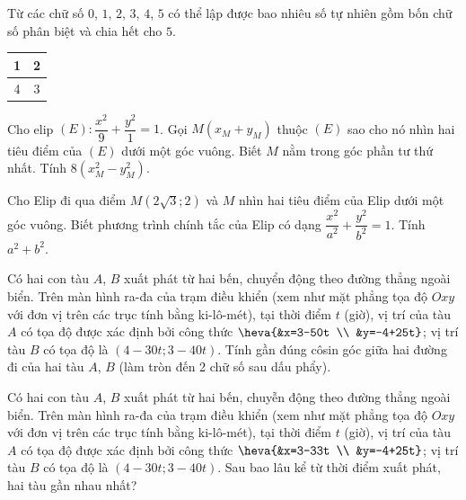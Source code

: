 \begin{ex}%
	Từ các chữ số $0$, $1$, $2$, $3$, $4$, $5$ có thể lập được bao nhiêu số tự nhiên gồm bốn chữ số phân biệt và chia hết cho $5$.
\loigiai{}
\end{ex}
\begin{ex}%
	{
	\begin{tabular}{|c|c|}
		\hline
		1& 2\\
		\hline
		4& 3\\
		\hline
	\end{tabular}	
	}
	\loigiai{}
\end{ex}
\begin{ex}%
Cho elip $(E)\colon \dfrac{x^2}{9}+\dfrac{y^2}{1}=1$. Gọi $M\left(x_M+y_M\right)$ thuộc $(E)$ sao cho nó nhìn hai tiêu điểm của $(E)$ dưới một góc vuông. Biết $M$ nằm trong góc phần tư thứ nhất. Tính $8\left(x_M^2-y_M^2\right)$.

\loigiai{}
\end{ex}

\begin{ex}%
Cho Elip đi qua điểm $M\left(2\sqrt{3}; 2\right)$ và $M$ nhìn hai tiêu điểm của Elip dưới một góc vuông. Biết phương trình chính tắc của Elip có dạng $\dfrac{x^2}{a^2}+\dfrac{y^2}{b^2}=1$. Tính $a^2+b^2$.
\loigiai{}
\end{ex}

\begin{ex}%
Có hai con tàu $A$, $B$ xuất phát từ hai bến, chuyển động theo đường thẳng ngoài biển. Trên màn hình ra-đa của trạm điều khiển (xem như mặt phẳng tọa độ $Ox y$ với đơn vị trên các trục tính bằng ki-lô-mét), tại thời điểm $t$ (giờ), vị trí của tàu $A$ có tọa độ được xác định bởi công thức $\heva{&x=3-50t \\
&y=-4+25t}$; vị trí tàu $B$ có tọa độ là $(4-30t; 3-40t)$.
Tính gần đúng côsin góc giữa hai đường đi của hai tàu $A$, $B$ (làm tròn đến 2 chữ số sau dấu phẩy).
\loigiai{}
\end{ex}
\begin{ex}%
Có hai con tàu $A$, $B$ xuất phát từ hai bến, chuyễn động theo đường thẳng ngoài biển. Trên màn hình ra-đa của trạm điều khiển (xem như mặt phẳng tọa độ $Ox y$ với đơn vị trên các trục tính bằng ki-lô-mét), tại thời điểm $t$ (giờ), vị trí của tàu $A$ có tọa độ được xác định bởi công thức $\heva{&x=3-33t \\
&y=-4+25t}$; vị trí tàu $B$ có tọa độ là $(4-30t; 3-40t)$. Sau bao lâu kể từ thời điểm xuất phát, hai tàu gần nhau nhất?
\loigiai{}
\end{ex}

